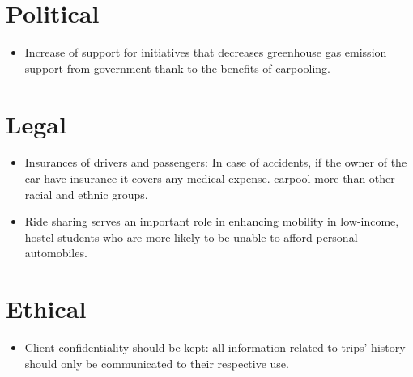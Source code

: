\section*{Political}
\begin{itemize}
\item Increase of support for initiatives that decreases greenhouse gas emission support from government thank to the benefits of carpooling.
\end{itemize}

\section*{Legal}
\begin{itemize}
\item Insurances of drivers and passengers: In case of accidents, if the owner of the car have insurance it covers any medical expense.
carpool more than other racial and ethnic groups.
\item Ride sharing serves an important role in enhancing mobility in low-income, hostel students who are more likely to be unable to afford personal automobiles.
\end{itemize}

\section*{Ethical}
\begin{itemize}
\item Client confidentiality should be kept: all information related to trips’ history should only be communicated to their respective use.
\end{itemize} 
  